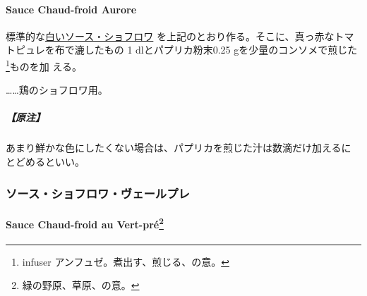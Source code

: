 \begin{recette}
\hypertarget{sauce-chaud-froid-aurore}{%
\paragraph{Sauce Chaud-froid Aurore}\label{sauce-chaud-froid-aurore}}


標準的な\protect\hyperlink{sauce-chaud-froid-blanche-ordinaire}{白いソース・ショフロワ}
を上記のとおり作る。そこに、真っ赤なトマトピュレを布で漉したもの
1\undemi{} dlとパプリカ粉末0.25 gを少量のコンソメで煎じた\footnote{infuser
  アンフュゼ。煮出す、煎じる、の意。}ものを加 える。

\ldots{}\ldots{}鶏のショフロワ用。

\hypertarget{ux539fux6ce8-3}{%
\subparagraph{【原注】}\label{ux539fux6ce8-3}}

あまり鮮かな色にしたくない場合は、パプリカを煎じた汁は数滴だけ加えるに
とどめるといい。

\maeaki

\hypertarget{ux30bdux30fcux30b9ux30b7ux30e7ux30d5ux30edux30efux30f4ux30a7ux30fcux30ebux30d7ux30ec}{%
\subsubsection{ソース・ショフロワ・ヴェールプレ}\label{ux30bdux30fcux30b9ux30b7ux30e7ux30d5ux30edux30efux30f4ux30a7ux30fcux30ebux30d7ux30ec}}

\hypertarget{sauce-choud-froid-vert-pre}{%
\paragraph[Sauce Chaud-froid au Vert-pré]{\texorpdfstring{Sauce
Chaud-froid au Vert-pré\footnote{緑の野原、草原、の意。}}{Sauce Chaud-froid au Vert-pré}}\label{sauce-choud-froid-vert-pre}}



\end{recette}
